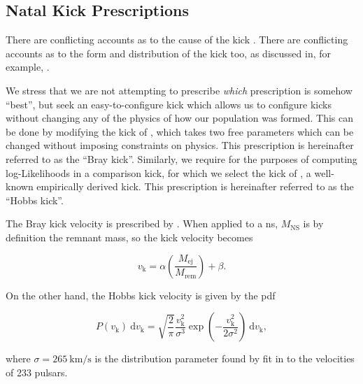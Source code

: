 \subsection{Natal Kick Prescriptions}\label{sec:natal_kick_prescriptions}

\alice

There are conflicting accounts as to the cause of the kick \citep[see, for example,][]{Fryer:1998, Arzoumanian:2002, Bombaci:2004, Hobbs:2005, Bray:2016, Verbunt:2017}. There are conflicting accounts as to the form and distribution of the kick too, as discussed in, for example, \citet{Blaauw:1961, Gunn:1970, De_loore:1975, Sutantyo:1978, Hobbs:2005, Baker:2008, Wongwathanarat:2013, Bray:2018, Giacobbo:2020, Mandel:2020}.

We stress that we are not attempting to prescribe \textit{which} prescription is somehow ``best'', but seek an easy-to-configure kick which allows us to configure kicks without changing any of the physics of how our population was formed. This can be done by modifying the kick of \citet{Bray:2016}, which takes two free parameters which can be changed without imposing constraints on physics. This prescription is hereinafter referred to as the ``Bray kick''. Similarly, we require for the purposes of computing log-Likelihoods in  a comparison kick, for which we select the kick of \citet{Hobbs:2005}, a well-known empirically derived kick. This prescription is hereinafter referred to as the ``Hobbs kick''.

The Bray kick velocity is prescribed by . When applied to a \gls{ns}, $M_\text{NS}$ is by definition the remnant mass, so the kick velocity becomes

\begin{equation}
    v_\text{k} = \alpha\left(\frac{M_\text{ej}}{M_\text{rem}}\right)+\beta.\label{eq:bray_kick}
\end{equation}

On the other hand, the Hobbs kick velocity is given by the \gls{pdf}

\begin{equation}
    P(v_\text{k})~\mathrm{d}v_\text{k} = \sqrt{\frac{2}{\pi}}\frac{v_\text{k}^2}{\sigma^3}\exp\left(-\frac{v_\text{k}^2}{2\sigma^2}\right)~\mathrm{d}v_\text{k},\label{eq:hobbs_kick}
\end{equation}

where $\sigma=\SI{265}{\km\per\s}$ is the distribution parameter found by fit in \citet{Hobbs:2005} to the velocities of 233 pulsars.

